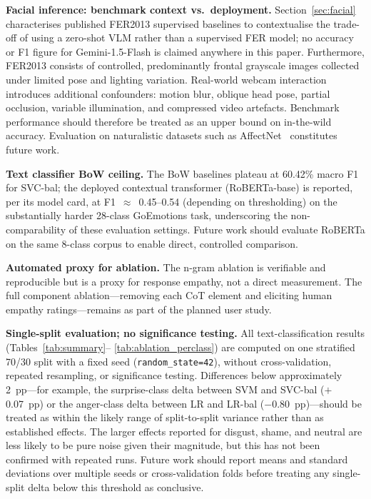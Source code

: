 \documentclass[conference]{IEEEtran}
\begin{document}
\textbf{Facial inference: benchmark context vs.\ deployment.}
Section~\ref{sec:facial} characterises published FER2013
supervised baselines to contextualise the trade-off of using a
zero-shot VLM rather than a supervised FER model; no accuracy or
F1 figure for Gemini-1.5-Flash is claimed anywhere in this paper.
Furthermore, FER2013 consists of controlled, predominantly
frontal grayscale images collected under limited pose and
lighting variation.
Real-world webcam interaction introduces additional
confounders: motion blur, oblique head pose, partial
occlusion, variable illumination, and compressed video
artefacts.
Benchmark performance should therefore be treated as an
upper bound on in-the-wild accuracy.
Evaluation on naturalistic datasets such as
AffectNet~\cite{mollahosseini2019affectnet} constitutes
future work.

\textbf{Text classifier BoW ceiling.}
The BoW baselines plateau at 60.42\% macro F1 for SVC-bal;
the deployed contextual transformer (RoBERTa-base) is reported,
per its model card, at F1~$\approx$~0.45--0.54 (depending on
thresholding) on the substantially harder 28-class GoEmotions
task, underscoring the non-comparability of these evaluation
settings.
Future work should evaluate RoBERTa on the same 8-class corpus
to enable direct, controlled comparison.

\textbf{Automated proxy for ablation.}
The n-gram ablation is verifiable and reproducible but is
a proxy for response empathy, not a direct measurement.
The full component ablation---removing each CoT element and
eliciting human empathy ratings---remains as part of the
planned user study.

\textbf{Single-split evaluation; no significance testing.}
All text-classification results (Tables~\ref{tab:summary}--%
\ref{tab:ablation_perclass}) are computed on one stratified
70/30 split with a fixed seed (\texttt{random\_state=42}), without
cross-validation, repeated resampling, or significance testing.
Differences below approximately 2~pp---for example, the
surprise-class delta between SVM and SVC-bal ($+$0.07~pp) or the
anger-class delta between LR and LR-bal ($-$0.80~pp)---should be
treated as within the likely range of split-to-split variance
rather than as established effects.
The larger effects reported for disgust, shame, and neutral are
less likely to be pure noise given their magnitude, but this has
not been confirmed with repeated runs.
Future work should report means and standard deviations over
multiple seeds or cross-validation folds before treating any
single-split delta below this threshold as conclusive.
\end{document}
